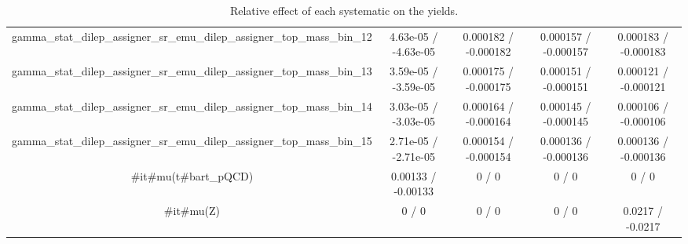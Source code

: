 \documentclass[10pt]{article}
\begin{document}
\begin{table}[htbp]
\begin{center}
\begin{tabular}{|c|c|c|c|c|}
  gamma_stat_dilep_assigner_sr_emu_dilep_assigner_top_mass_bin_12 & 4.63e-05 / -4.63e-05 & 0.000182 / -0.000182 & 0.000157 / -0.000157 & 0.000183 / -0.000183 \\ 
  gamma_stat_dilep_assigner_sr_emu_dilep_assigner_top_mass_bin_13 & 3.59e-05 / -3.59e-05 & 0.000175 / -0.000175 & 0.000151 / -0.000151 & 0.000121 / -0.000121 \\ 
  gamma_stat_dilep_assigner_sr_emu_dilep_assigner_top_mass_bin_14 & 3.03e-05 / -3.03e-05 & 0.000164 / -0.000164 & 0.000145 / -0.000145 & 0.000106 / -0.000106 \\ 
  gamma_stat_dilep_assigner_sr_emu_dilep_assigner_top_mass_bin_15 & 2.71e-05 / -2.71e-05 & 0.000154 / -0.000154 & 0.000136 / -0.000136 & 0.000136 / -0.000136 \\ 
  #it{#mu}(t#bar{t}_{pQCD}) & 0.00133 / -0.00133 & 0 / 0 & 0 / 0 & 0 / 0 \\ 
  #it{#mu}(Z) & 0 / 0 & 0 / 0 & 0 / 0 & 0.0217 / -0.0217 \\ 
\hline 
\end{tabular} 
\caption{Relative effect of each systematic on the yields.} 
\end{center} 
\end{table} 
\end{document}
